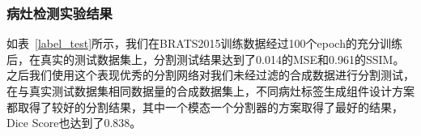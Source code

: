 \documentclass[letterpaper]{article} %
\begin{document}
\subsubsection{病灶检测实验结果}
\begin{table}[t]
	\caption{病灶检测实验结果.}\smallskip
	\centering
	\label{label_test}	
\end{table}

如表~\ref{label_test}所示，我们在BRATS2015训练数据经过100个epoch的充分训练后，在真实的测试数据集上，分割测试结果达到了0.014的MSE和0.961的SSIM\cite{93wang2004image}。之后我们使用这个表现优秀的分割网络对我们未经过滤的合成数据进行分割测试，在与真实测试数据集相同数据量的合成数据集上，不同病灶标签生成组件设计方案都取得了较好的分割结果，其中一个模态一个分割器的方案取得了最好的结果，Dice Score也达到了0.838。
\end{document}
